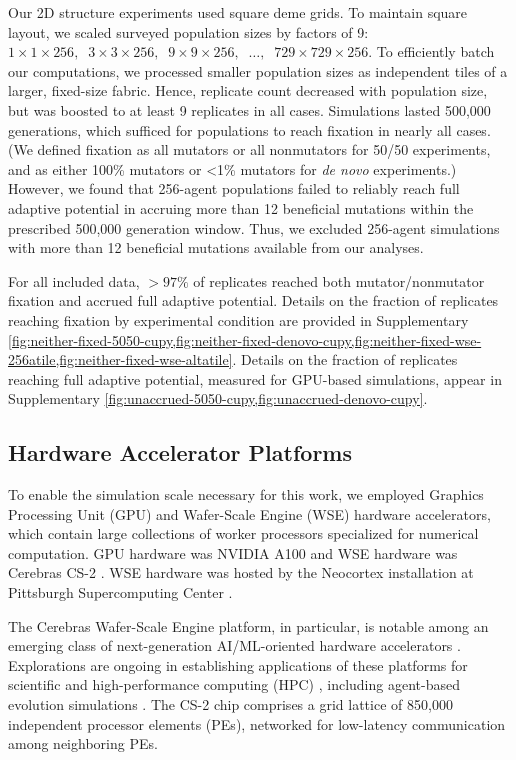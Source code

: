Our 2D structure experiments used square deme grids.
To maintain square layout, we scaled surveyed population sizes by factors of 9: $1 \times 1 \times 256,\;\; 3 \times 3 \times 256,\;\; 9 \times 9 \times 256,\;\; \ldots,\;\; 729 \times 729 \times 256$.
To efficiently batch our computations, we processed smaller population sizes as independent tiles of a larger, fixed-size fabric.
Hence, replicate count decreased with population size, but was boosted to at least 9 replicates in all cases.
Simulations lasted 500,000 generations, which sufficed for populations to reach fixation in nearly all cases.
(We defined fixation as all mutators or all nonmutators for 50/50 experiments, and as either 100\% mutators or <1\% mutators for \textit{de novo} experiments.)
However, we found that 256-agent populations failed to reliably reach full adaptive potential in accruing more than 12 beneficial mutations within the prescribed 500,000 generation window.
Thus, we excluded 256-agent simulations with more than 12 beneficial mutations available from our analyses.

For all included data, $>97\%$ of replicates reached both mutator/nonmutator fixation and accrued full adaptive potential.
Details on the fraction of replicates reaching fixation by experimental condition are provided in Supplementary \cref{fig:neither-fixed-5050-cupy,fig:neither-fixed-denovo-cupy,fig:neither-fixed-wse-256atile,fig:neither-fixed-wse-altatile}.
Details on the fraction of replicates reaching full adaptive potential, measured for GPU-based simulations, appear in Supplementary \cref{fig:unaccrued-5050-cupy,fig:unaccrued-denovo-cupy}.

\subsection{Hardware Accelerator Platforms} \label{sec:hardware}

To enable the simulation scale necessary for this work, we employed Graphics Processing Unit (GPU) and Wafer-Scale Engine (WSE) hardware accelerators, which contain large collections of worker processors specialized for numerical computation.
GPU hardware was NVIDIA A100 and WSE hardware was Cerebras CS-2 \citep{choquette2021nvidia,cerebras2021wafer}.
WSE hardware was hosted by the Neocortex installation at Pittsburgh Supercomputing Center \citep{buitrago2021neocortex}.

The Cerebras Wafer-Scale Engine platform, in particular, is notable among an emerging class of next-generation AI/ML-oriented hardware accelerators \citep{lauterbach2021path}.
Explorations are ongoing in establishing applications of these platforms for scientific and high-performance computing (HPC) \citep{rocki2020fast,brown2023exploring,ltaief2023scaling,sai2023massively,brown2022distributed,luow2020using,woo2022distributed,tramm2024efficient,chen2024using,phillips2023solving,chen2024solving}, including agent-based evolution simulations \citep{moreno2024trackable}.
The CS-2 chip comprises a grid lattice of 850,000 independent processor elements (PEs), networked for low-latency communication among neighboring PEs.

